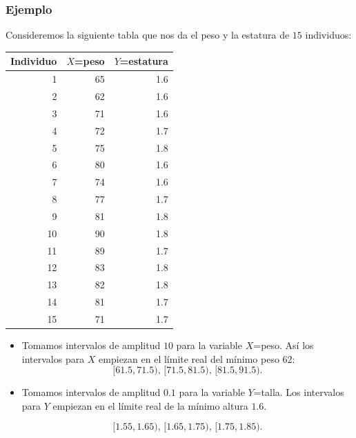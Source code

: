 \begin{frame}
\frametitle{Ejemplo}
Consideremos la siguiente tabla que nos da el peso y la estatura de  $15$ individuos:
\begin{center}
{\tiny
\begin{tabular}{rrr}
Individuo   &  $X$=peso & $Y$=estatura\\ \hline
1        &           65         &          1.6  \\
2        &           62         &          1.6  \\
3        &           71         &          1.6 \\
4        &           72         &          1.7 \\
5        &           75         &          1.8 \\
6        &           80         &          1.6 \\
7        &           74         &          1.6 \\
8        &           77         &          1.7 \\
9        &           81         &          1.8 \\
10       &           90         &          1.8 \\
11       &           89         &          1.7 \\
12       &           83         &          1.8 \\
13       &           82         &          1.8 \\
14       &           81         &          1.7 \\
15       &           71         &          1.7
\end{tabular}}
\end{center}
\end{frame}

\begin{frame}

\begin{itemize}
\item Tomamos intervalos de amplitud  $10$ para la variable $X$=peso. Así los intervalos para
$X$ empiezan en el límite real del  mínimo peso $62$:
$$[61.5,71.5) \mbox{, } [71.5,81.5) \mbox{, }  [81.5,91.5).$$
\item Tomamos intervalos de amplitud   $0.1$ para la variable $Y$=talla. Los intervalos para
$Y$ empiezan en el límite real de la  mínimo altura $1.6$.

$$
[1.55,1.65)  \mbox{, } [1.65,1.75) \mbox{, }  [1.75,1.85).
$$
\end{itemize}
\end{frame}

